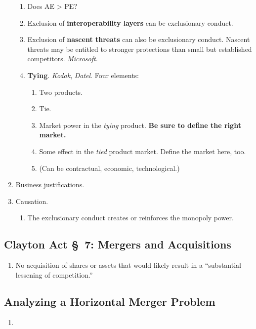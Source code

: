 \begin{enumerate}
\begin{enumerate}
        \item Does AE > PE?
        \item Exclusion of \textbf{interoperability layers} can be 
        exclusionary conduct.
        \item Exclusion of \textbf{nascent threats} can also be exclusionary 
        conduct. Nascent threats may be entitled to stronger protections than 
        small but established competitors. \emph{Microsoft}.
        \item \textbf{Tying}. \emph{Kodak}, \emph{Datel}. Four elements:
        \begin{enumerate}
            \item Two products.
            \item Tie.
            \item Market power in the \emph{tying} product. \textbf{Be sure to 
            define the right market.}
            \item Some effect in the \emph{tied} product market. Define the 
            market here, too.
            \item (Can be contractual, economic,  technological.)
        \end{enumerate}
    \end{enumerate}
    \item Business justifications.
    \item Causation.
    \begin{enumerate}
        \item The exclusionary conduct creates or reinforces the monopoly 
        power.
    \end{enumerate}
\end{enumerate}

\subsection{Clayton Act \S\ 7: Mergers and Acquisitions}

\begin{enumerate}
    \item No acquisition of shares or assets that would likely result in a 
    ``substantial lessening of competition.''
\end{enumerate}

\subsection{Analyzing a Horizontal Merger Problem}

\begin{enumerate}
    \item %
\end{enumerate}
